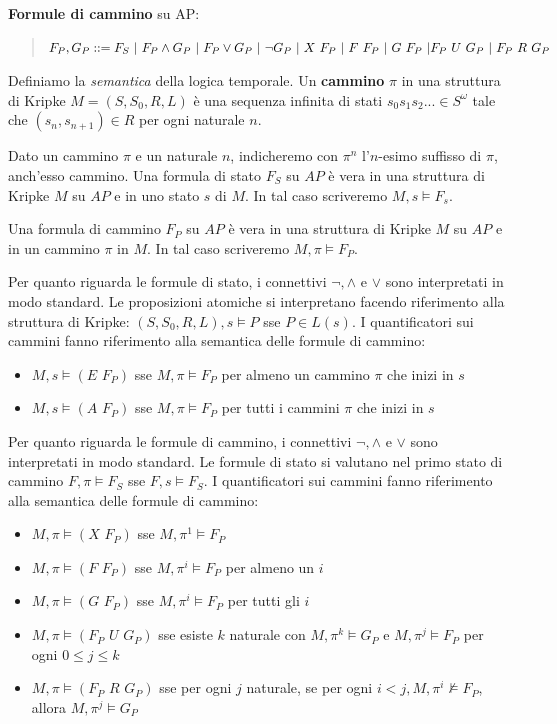 \documentclass{article}
\begin{document}
\bigskip

\textbf{Formule di cammino} su AP:
\begin{quote}
    $F_P,G_P::=F_S\,\,|\,\,F_P\land G_P\,\,|\,\,F_P\lor G_P\,\,|\,\,\lnot G_P\,\,|\,\,X\,\,F_P\,\,|\,\,F\,\,F_P\,\,|\,\,G\,\,F_P\,\,|\\F_P\,\,U\,\,G_P\,\,|\,\,F_P\,\,R\,\,G_P$
\end{quote}

\bigskip

Definiamo la \textit{semantica} della logica temporale. Un \textbf{cammino} $\pi$ in una struttura di Kripke $M=(S,S_0,R,L)$ è una sequenza infinita di stati $s_0s_1s_2...\in S^\omega$ tale che $(s_n,s_{n+1})\in R$ per ogni naturale $n$.

\bigskip

Dato un cammino $\pi$ e un naturale $n$, indicheremo con $\pi^n$ l'$n$-esimo suffisso di $\pi$, anch'esso cammino. Una formula di stato $F_S$ su $AP$ è vera in una struttura di Kripke $M$ su $AP$ e in uno stato $s$ di $M$. In tal caso scriveremo $M,s\vDash F_s$.

\bigskip

Una formula di cammino $F_P$ su $AP$ è vera in una struttura di Kripke $M$ su $AP$ e in un cammino $\pi$ in $M$. In tal caso scriveremo $M,\pi\vDash F_P$.

\bigskip

Per quanto riguarda le formule di stato, i connettivi $\lnot, \land$ e $\lor$ sono interpretati in modo standard. Le proposizioni atomiche si interpretano facendo riferimento alla struttura di Kripke: $(S,S_0,R,L),s\vDash P$ sse $P\in L(s)$. I quantificatori sui cammini fanno riferimento alla semantica delle formule di cammino:
\begin{itemize}
    \item $M,s\vDash (E\,\,F_P)$ sse $M,\pi\vDash F_P$ per almeno un cammino $\pi$ che inizi in $s$
    \item $M,s\vDash (A\,\,F_P)$ sse $M,\pi\vDash F_P$ per tutti i cammini $\pi$ che inizi in $s$
\end{itemize}

Per quanto riguarda le formule di cammino, i connettivi $\lnot, \land$ e $\lor$ sono interpretati in modo standard. Le formule di stato si valutano nel primo stato di cammino $F,\pi\vDash F_S$ sse $F,s\vDash F_S$. I quantificatori sui cammini fanno riferimento alla semantica delle formule di cammino:
\begin{itemize}
    \item $M,\pi\vDash(X\,\,F_P)$ sse $M,\pi^1\vDash F_P$
    \item $M,\pi\vDash(F\,\,F_P)$ sse $M,\pi^i\vDash F_P$ per almeno un $i$
    \item $M,\pi\vDash(G\,\,F_P)$ sse $M,\pi^i\vDash F_P$ per tutti gli $i$
    \item $M,\pi\vDash(F_P\,\,U\,\,G_P)$ sse esiste $k$ naturale con $M,\pi^k\vDash G_P$ e $M,\pi^j\vDash F_P$ per ogni $0\leq j\leq k$
    \item $M,\pi\vDash(F_P\,\,R\,\,G_P)$ sse per ogni $j$ naturale, se per ogni $i<j,M,\pi^i\not\vDash F_P$, allora $M,\pi^j\vDash G_P$
\end{itemize}
\end{document}
